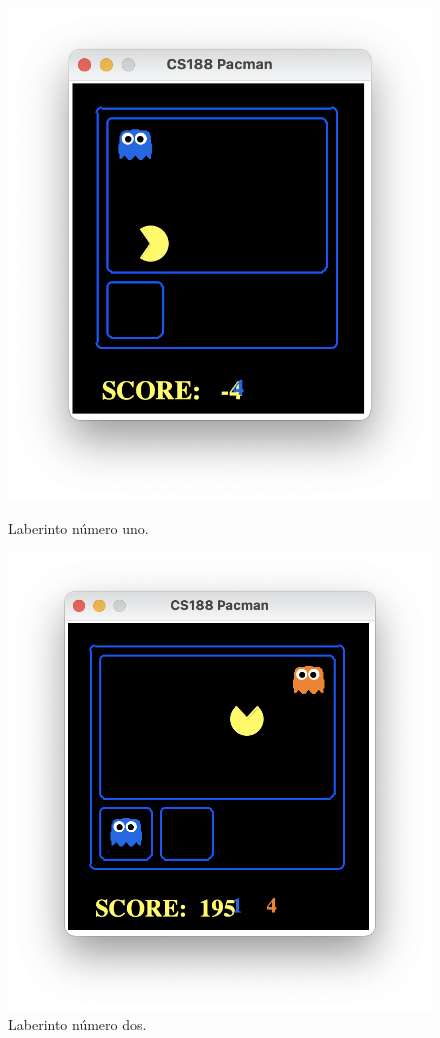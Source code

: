 \documentclass[11pt]{exam}
\begin{document}
\begin{figure}[H]
	\begin{minipage}[c]{0.4\linewidth}
		\includegraphics[scale=0.4]{lab1}
		\caption{Laberinto número uno.}
		\label{lab1}
	\end{minipage}
	\hfill
	\begin{minipage}[c]{0.4\linewidth}
		\includegraphics[scale=0.4]{lab2}
		\caption{Laberinto número dos.}
		\label{lab2}
	\end{minipage}
\end{figure}
\end{document}
